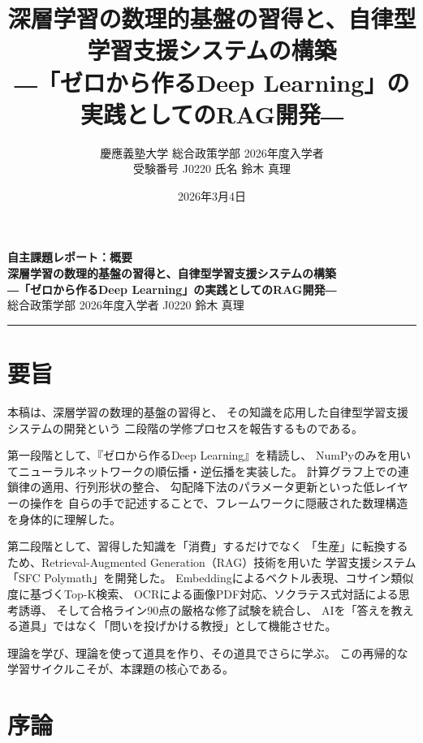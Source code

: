 \documentclass[uplatex, dvipdfmx, a4paper, 11pt]{jsarticle}
\title{深層学習の数理的基盤の習得と、自律型学習支援システムの構築\\
\large ―「ゼロから作るDeep Learning」の実践としてのRAG開発―}
\author{慶應義塾大学 総合政策学部 2026年度入学者\\
受験番号 J0220 \quad 氏名 鈴木 真理}
\date{2026年3月4日}
\begin{document}
\begin{center}
    {\Large \textbf{自主課題レポート：概要}} \\[5mm]
    {\large \textbf{深層学習の数理的基盤の習得と、自律型学習支援システムの構築}} \\[2mm]
    {\large \textbf{―「ゼロから作るDeep Learning」の実践としてのRAG開発―}} \\[5mm]
    {\large 総合政策学部 2026年度入学者 \quad J0220 \quad 鈴木 真理} \\[2mm]
    \rule{\textwidth}{0.4mm}
\end{center}

\thispagestyle{empty}

\section*{要旨}
本稿は、深層学習の数理的基盤の習得と、
その知識を応用した自律型学習支援システムの開発という
二段階の学修プロセスを報告するものである。

第一段階として、『ゼロから作るDeep Learning』を精読し、
NumPyのみを用いてニューラルネットワークの順伝播・逆伝播を実装した。
計算グラフ上での連鎖律の適用、行列形状の整合、
勾配降下法のパラメータ更新といった低レイヤーの操作を
自らの手で記述することで、フレームワークに隠蔽された数理構造を身体的に理解した。

第二段階として、習得した知識を「消費」するだけでなく
「生産」に転換するため、Retrieval-Augmented Generation（RAG）技術を用いた
学習支援システム「SFC Polymath」を開発した。
Embeddingによるベクトル表現、コサイン類似度に基づくTop-K検索、
OCRによる画像PDF対応、ソクラテス式対話による思考誘導、
そして合格ライン90点の厳格な修了試験を統合し、
AIを「答えを教える道具」ではなく「問いを投げかける教授」として機能させた。

理論を学び、理論を使って道具を作り、その道具でさらに学ぶ。
この再帰的な学習サイクルこそが、本課題の核心である。

\vfill
\clearpage

\setcounter{page}{1}

\section{序論}
\end{document}
